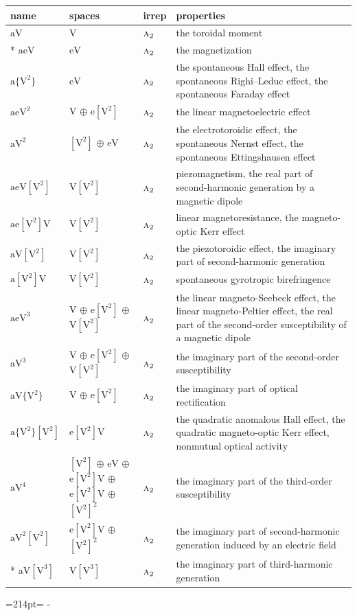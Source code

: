 \documentclass[10pt,a4paper]{article}
\newcommand{\needspace}[1]{\par\penalty-100\begingroup\dimen0=#1\relax\dimen2=\pagegoal
  \advance\dimen2-\pagetotal\ifdim\dimen0>\dimen2\relax\ifdim\dimen2>0pt\vfil\break\fi\fi
  \endgroup}
\numberwithin{equation}{section}
\newcommand{\irr}[1]{\text{\normalfont\scshape #1}}
\newcommand{\jahn}[1]{\mathrm{#1}}
\newlength{\fillwidth}\newlength{\cellwidth}\newlength{\colwidth}
\begin{document}
{\begin{longtable}{@{}lll>{\RaggedRight\arraybackslash}p{\fillwidth}@{}}
name & spaces & irrep & properties\\\midrule\endhead
\bottomrule\endfoot\endlastfoot
$\jahn{aV}$ & $\jahn{V}$ & $\irr{a}_{2}$ & the toroidal moment\\*
$\jahn{aeV}$ & $\jahn{eV}$ & $\irr{a}_{2}$ & the magnetization\\
$\jahn{a\{V^{2}\}}$ & $\jahn{eV}$ & $\irr{a}_{2}$ & the spontaneous Hall effect, the spontaneous Righi–Leduc effect, the spontaneous Faraday effect\\
$\jahn{aeV^{2}}$ & $\jahn{V}$ $\oplus$ $\jahn{e[V^{2}]}$ & $\irr{a}_{2}$ & the linear magnetoelectric effect\\
$\jahn{aV^{2}}$ & $\jahn{[V^{2}]}$ $\oplus$ $\jahn{eV}$ & $\irr{a}_{2}$ & the electrotoroidic effect, the spontaneous Nernst effect, the spontaneous Ettingshausen effect\\
$\jahn{aeV[V^{2}]}$ & $\jahn{V[V^{2}]}$ & $\irr{a}_{2}$ & piezomagnetism, the real part of second-harmonic generation by a magnetic dipole\\
$\jahn{ae[V^{2}]V}$ & $\jahn{V[V^{2}]}$ & $\irr{a}_{2}$ & linear magnetoresistance, the magneto-optic Kerr effect\\
$\jahn{aV[V^{2}]}$ & $\jahn{V[V^{2}]}$ & $\irr{a}_{2}$ & the piezotoroidic effect, the imaginary part of second-harmonic generation\\
$\jahn{a[V^{2}]V}$ & $\jahn{V[V^{2}]}$ & $\irr{a}_{2}$ & spontaneous gyrotropic birefringence\\
$\jahn{aeV^{3}}$ & $\jahn{V}$ $\oplus$ $\jahn{e[V^{2}]}$ $\oplus$ $\jahn{V[V^{2}]}$ & $\irr{a}_{2}$ & the linear magneto-Seebeck effect, the linear magneto-Peltier effect, the real part of the second-order susceptibility of a magnetic dipole\\
$\jahn{aV^{3}}$ & $\jahn{V}$ $\oplus$ $\jahn{e[V^{2}]}$ $\oplus$ $\jahn{V[V^{2}]}$ & $\irr{a}_{2}$ & the imaginary part of the second-order susceptibility\\
$\jahn{aV\{V^{2}\}}$ & $\jahn{V}$ $\oplus$ $\jahn{e[V^{2}]}$ & $\irr{a}_{2}$ & the imaginary part of optical rectification\\
$\jahn{a\{V^{2}\}[V^{2}]}$ & $\jahn{e[V^{2}]V}$ & $\irr{a}_{2}$ & the quadratic anomalous Hall effect, the quadratic magneto-optic Kerr effect, nonmutual optical activity\\
$\jahn{aV^{4}}$ & $\jahn{[V^{2}]}$ $\oplus$ $\jahn{eV}$ $\oplus$ $\jahn{e[V^{2}]V}$ $\oplus$ $\jahn{e[V^{2}]V}$ $\oplus$ $\jahn{[V^{2}]^{2}}$ & $\irr{a}_{2}$ & the imaginary part of the third-order susceptibility\\
$\jahn{aV^{2}[V^{2}]}$ & $\jahn{e[V^{2}]V}$ $\oplus$ $\jahn{[V^{2}]^{2}}$ & $\irr{a}_{2}$ & the imaginary part of second-harmonic generation induced by an electric field\\*
$\jahn{aV[V^{3}]}$ & $\jahn{V[V^{3}]}$ & $\irr{a}_{2}$ & the imaginary part of third-harmonic generation\\
\bottomrule\end{longtable}}
\needspace{214pt}
\end{document}
